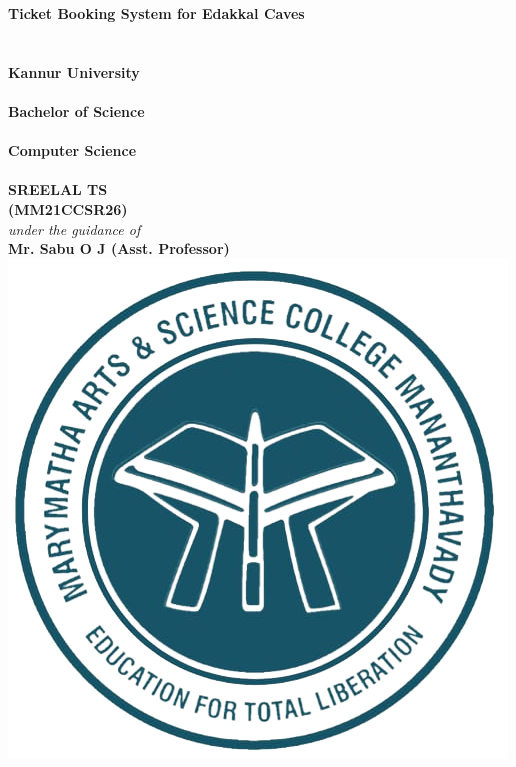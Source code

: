 \documentclass[12pt,a4paper]{report}
\begin{document}

\thispagestyle{empty}

\begin{center}
    \fontsize{25pt}{18pt}\selectfont \textbf{
        Ticket Booking System for Edakkal Caves
    }\\[.5 cm]
    \fontsize{12pt}{18pt}\selectfont {}\\[.5 cm]
    \fontsize{12pt}{18pt}\selectfont {}\\[.7 cm]
    \fontsize{14pt}{18pt}\selectfont \textbf{Kannur
        University}\\[.2 cm]
    \fontsize{12pt}{18pt}\selectfont {}\\[.5 cm]
    \vspace{0.4cm}
    \fontsize{14pt}{18pt}\selectfont \textbf{Bachelor of Science}\\
    \fontsize{12pt}{18pt}\selectfont {}\\
    \fontsize{12pt}{18pt}\selectfont \textbf{Computer Science}\\
    \fontsize{12pt}{18pt}\selectfont {}\\
    \vspace{0.4cm}
    \fontsize{17.28pt}{18pt}\selectfont \textbf{SREELAL TS}\\[.2 cm]
    \fontsize{14pt}{18pt}\selectfont \textbf{(MM21CCSR26)}\\[.5 cm]
    \fontsize{12pt}{18pt}\selectfont \textit{under the guidance of}\\[.4 cm]
    \fontsize{14pt}{18pt}\selectfont \textbf{Mr. Sabu O J (Asst. Professor)}\\
    \vspace{.7cm}
    \includegraphics[scale=0.25]{assets/mmc.png}\\[.2 cm]

\end{center}
\end{document}
